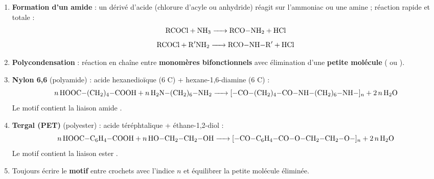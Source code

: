 \documentclass[11pt]{article}
\newcommand{\cle}[1]{{\popxbold\color{popdark}#1}}
\begin{document}
\begin{methode}
\begin{enumerate}
\item \textbf{Formation d'un amide} : un dérivé d'acide (chlorure d'acyle ou anhydride) réagit sur l'ammoniac ou une amine ; réaction rapide et totale :
\[ \ce{RCOCl + NH3 -> RCO-NH2 + HCl} \]
\[ \ce{RCOCl + R$'$NH2 -> RCO-NH-R$'$ + HCl} \]
\item \textbf{Polycondensation} : réaction en chaîne entre \textbf{monomères bifonctionnels} avec élimination d'une \textbf{petite molécule} ( ou ).
\item \textbf{Nylon 6,6} (polyamide) : acide hexanedioïque (6 C) + hexane-1,6-diamine (6 C) :
\[ \ce{n HOOC-(CH2)4-COOH + n H2N-(CH2)6-NH2 -> [-CO-(CH2)4-CO-NH-(CH2)6-NH-]_n + 2n H2O} \]
Le motif contient la liaison \cle{amide} .
\item \textbf{Tergal (PET)} (polyester) : acide téréphtalique + éthane-1,2-diol :
\[ \ce{n HOOC-C6H4-COOH + n HO-CH2-CH2-OH -> [-CO-C6H4-CO-O-CH2-CH2-O-]_n + 2n H2O} \]
Le motif contient la liaison \cle{ester} .
\item Toujours écrire le \textbf{motif} entre crochets avec l'indice $n$ et équilibrer la petite molécule éliminée.
\end{enumerate}
\end{methode}
\end{document}
